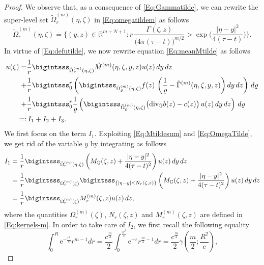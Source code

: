 \documentclass[11pt,a4paper]{article}
\numberwithin{equation}{section}
\newcommand{\R}{\mathbb{R}}
\def \r {\varrho}
\def \GG {{\mathbb{G}}}
\def \div {{\text{\rm div}}}
\def \t {{\tau}}
\def \y {{\eta}}
\def \z {{\zeta}}
\begin{document}
{{\begin{proof}
	We observe that, as a consequence of \eqref{Eq:Gammatilde}, we can rewrite the super-level set $\tilde{\Omega}_r^{(m)}(\y,\z)$ in \eqref{Eq:omegatildem} as follows
	\begin{equation}\label{Eq:OmegaTilde}
		\tilde{\Omega}_r^{(m)}(\y,\z)= \Biggl\{ (y,z) \in \R^{m+N+1}: r\, \frac{\Gamma(\z,z)}{\big(4\pi(\t-t)\big)^{m/2}} > \exp\Bigg( \frac{|\y-y|^2}{4(\t-t)}\Bigg) \Biggr\}.
	\end{equation}
	In virtue of \eqref{Eq:defutilde}, we now rewrite equation \eqref{Eq:meanMtilde} as follows
	\begin{equation}\label{Eq:meanMtildeu}
		\begin{aligned}
			u(\z)= &\frac{1}{r} \bigintsss_{\tilde{\Omega}_r^{(m)}(\y,\z)} \tilde{M}^{(m)} (\y,\z, y,z) u(z)\, dy\, dz \\
			\quad+ &\frac{1}{r}  \bigintsss_0^{r} \left(
			\bigintsss_{\tilde{\Omega}^{(m)}_\r (\y,\z)} f(z) \,\left(\frac{1}{\r}-\tilde{\Gamma}^{(m)}(\y,\z,y,z) \right)dy  \, dz \right)\, d \r \\
			\quad+& \frac{1}{r} \bigintsss_0^{r}  \frac{1}{\r} \left(\bigintsss_{\tilde{\Omega}^{(m)}_\r (\y,\z)} \big( \div_{\GG} b(z) - c(z) \big) \,u(z)\,dy \, dz \right) \, d \r\\
			=:&\,I_1+I_2+I_3.
		\end{aligned}	
	\end{equation}
	We first focus on the term $I_1$. Exploiting \eqref{Eq:Mtildesum} and \eqref{Eq:OmegaTilde}, we get rid of the variable $y$ by integrating as follows
	\begin{equation}\label{Eq:I1}
		\begin{aligned}
			I_1&=\frac{1}{r}\bigintsss_{\tilde{\Omega}_r^{(m)}(\y,\z)} \left( M_\GG(\z,z)+\frac{|\y-y|^2}{4(\t-t)^2}\right) u(z)\, dy\, dz \\
			&=\frac{1}{r}\bigintsss_{{\Omega}_r^{(m)}(\z)}\bigintsss_{\lbrace |\y-y|<N_r(\z,z) \rbrace} \left( M_\GG(\z,z)+\frac{|\y-y|^2}{4(\t-t)^2}\right) u(z)\, dy\, dz\\
			&=\frac{1}{r} \bigintsss_{{\Omega}_r^{(m)}(\z)} M_r^{(m)}(\z,z) u(z)\, dz,
		\end{aligned}
	\end{equation}
	where the quantities $\Omega_r^{(m)}(\z)$, $N_r(\z,z)$ and $M_r^{(m)}(\z,z)$ are defined in \eqref{Eq:kernels-m}. In order to take care of $I_2$, we first recall the following equality 
	\begin{equation*}
		\int_0^R 	\mathrm{e}^{-\frac{r^2}{c}}r^{m-1}dr=\frac{c^{\frac{m}{2}}}{2}\int_0^{\frac{R^2}{c}}\mathrm{e}^{-r}r^{\frac{m}{2}-1}dr=\frac{c^{\frac{m}{2}}}{2}\gamma\left(\frac{m}{2};\frac{R^2}{c} \right),

\end{equation*}
\end{proof}}}
\end{document}
